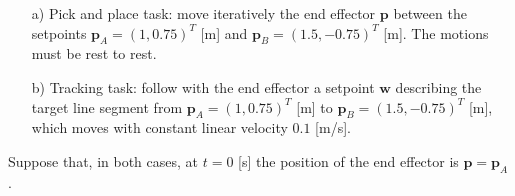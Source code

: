 \documentclass[a4paper]{article}
\begin{document}
\begin{itemize}


\item[a)] Pick and place task: move iteratively the end effector $\mathbf{p}$ between the setpoints 
$\mathbf{p}_A = (1, 0.75)^T$ [m] and 
$\mathbf{p}_B = (1.5, -0.75)^T$ [m]. The motions must be rest to rest.


\item[b)]
Tracking task: follow with the end effector a setpoint $\mathbf{w}$ describing the target line segment from $\mathbf{p}_A = (1, 0.75)^T$ [m] to
$\mathbf{p}_B = (1.5, -0.75)^T$ [m], which moves with constant linear velocity $0.1$ [m/s]. 



\end{itemize}

\noindent
Suppose that, in both cases, at $t=0$ [s] the position of the end effector is 
$
\mathbf{p} = \mathbf{p}_A
$.
\end{document}
